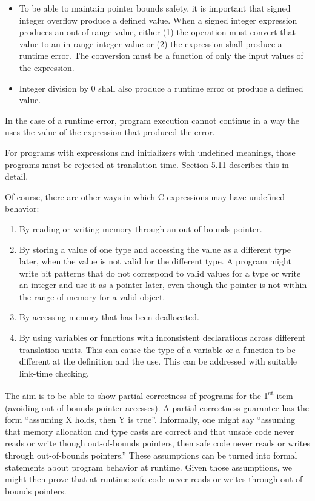 \documentclass[]{article}
\begin{document}
\begin{itemize}
\item
  To be able to maintain pointer bounds safety, it is important that
  signed integer overflow produce a defined value. When a signed integer
  expression produces an out-of-range value, either (1) the operation
  must convert that value to an in-range integer value or (2) the
  expression shall produce a runtime error. The conversion must be a
  function of only the input values of the expression.
\item
  Integer division by 0 shall also produce a runtime error or produce a
  defined value.
\end{itemize}

In the case of a runtime error, program execution cannot continue in a
way the uses the value of the expression that produced the error.

For programs with expressions and initializers with undefined meanings,
those programs must be rejected at translation-time. Section 5.11
describes this in detail.

Of course, there are other ways in which C expressions may have
undefined behavior:

\begin{enumerate}
\def\labelenumi{\arabic{enumi}.}
\item
  By reading or writing memory through an out-of-bounds pointer.
\item
  By storing a value of one type and accessing the value as a different
  type later, when the value is not valid for the different type. A
  program might write bit patterns that do not correspond to valid
  values for a type or write an integer and use it as a pointer later,
  even though the pointer is not within the range of memory for a valid
  object.
\item
  By accessing memory that has been deallocated.
\item
  By using variables or functions with inconsistent declarations across
  different translation units. This can cause the type of a variable or
  a function to be different at the definition and the use. This can be
  addressed with suitable link-time checking.
\end{enumerate}

The aim is to be able to show partial correctness of programs for the
1\textsuperscript{st} item (avoiding out-of-bounds pointer accesses). A
partial correctness guarantee has the form ``assuming X holds, then Y is
true''. Informally, one might say ``assuming that memory allocation and
type casts are correct and that unsafe code never reads or write though
out-of-bounds pointers, then safe code never reads or writes through
out-of-bounds pointers.'' These assumptions can be turned into formal
statements about program behavior at runtime. Given those assumptions,
we might then prove that at runtime safe code never reads or writes
through out-of-bounds pointers.
\end{document}
